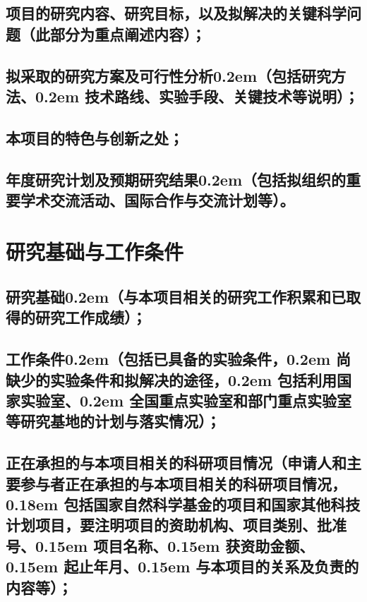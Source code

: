 \documentclass[GP]{nsfc}
\begin{document}






\section{\textbf{项目的研究内容、研究目标，以及拟解决的关键科学问题}（此部分为重点阐述内容）\textbf{；}}

\section{\textbf{拟采取的研究方案及可行性分析}\kern0.2em（包括研究方法、\kern0.2em 技术路线、实验手段、关键技术等说明）；}

\section{\textbf{本项目的特色与创新之处；}}

\section{\textbf{年度研究计划及预期研究结果}\kern0.2em（包括拟组织的重要学术交流活动、国际合作与交流计划等）。}

\chapter{\textbf{研究基础与工作条件}}
\section{\textbf{研究基础}\kern0.2em（与本项目相关的研究工作积累和已取得的研究工作成绩）；}

\section{\textbf{工作条件}\kern0.2em（包括已具备的实验条件，\kern0.2em 尚缺少的实验条件和拟解决的途径，\kern0.2em 包括利用国家实验室、\kern0.2em 全国重点实验室和部门重点实验室等研究基地的计划与落实情况）；}

\section{\textbf{正在承担的与本项目相关的科研项目情况}（申请人和主要参与者正在承担的与本项目相关的科研项目情况，\kern0.18em 包括国家自然科学基金的项目和国家其他科技计划项目，要注明项目的资助机构、项目类别、批准号、\kern0.15em 项目名称、\kern0.15em 获资助金额、\kern 0.15em 起止年月、\kern0.15em 与本项目的关系及负责的内容等）；}
\end{document}
